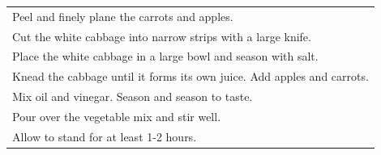 \begin{tabular}{p{15cm}}
	\\
  Peel and finely plane the carrots and apples.\\
  Cut the white cabbage into narrow strips with a large knife.\\
  Place the white cabbage in a large bowl and season with salt.\\
  Knead the cabbage until it forms its own juice. Add apples and carrots.\\
  Mix oil and vinegar. Season and season to taste.\\
  Pour over the vegetable mix and stir well.\\
  Allow to stand for at least 1-2 hours.
\end{tabular}
